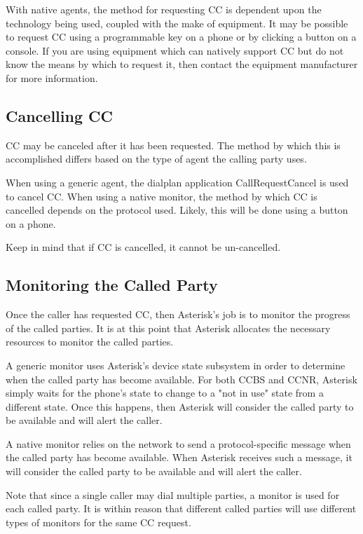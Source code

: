 	With native agents, the method for requesting CC is dependent upon
the technology being used, coupled with the make of equipment. It may
be possible to request CC using a programmable key on a phone or by
clicking a button on a console. If you are using equipment which can
natively support CC but do not know the means by which to request it,
then contact the equipment manufacturer for more information.

\subsection{Cancelling CC}

	CC may be canceled after it has been requested. The method by which
this is accomplished differs based on the type of agent the calling
party uses.

	When using a generic agent, the dialplan application
CallRequestCancel is used to cancel CC. When using a native monitor,
the method by which CC is cancelled depends on the protocol used.
Likely, this will be done using a button on a phone.

	Keep in mind that if CC is cancelled, it cannot be un-cancelled.

\subsection{Monitoring the Called Party}

	Once the caller has requested CC, then Asterisk's job is to monitor
the progress of the called parties. It is at this point that Asterisk
allocates the necessary resources to monitor the called parties.

	A generic monitor uses Asterisk's device state subsystem in order
to determine when the called party has become available. For both CCBS
and CCNR, Asterisk simply waits for the phone's state to change to
a "not in use" state from a different state. Once this happens, then
Asterisk will consider the called party to be available and will alert
the caller.

	A native monitor relies on the network to send a protocol-specific
message when the called party has become available. When Asterisk
receives such a message, it will consider the called party to be
available and will alert the caller.

	Note that since a single caller may dial multiple parties, a monitor
is used for each called party. It is within reason that different called
parties will use different types of monitors for the same CC request.


